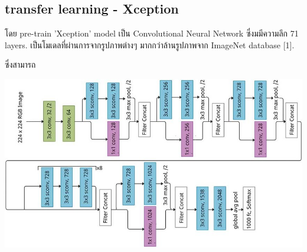   \subsection{transfer learning - Xception}
  โดย pre-train 'Xception' model เป็น Convolutional Neural Network ซึ่งมมีความลึก 71 layers.
เป็นโมเดลที่ผ่านการจากรูปภาพต่างๆ มากกว่าล้านรูปภาพจาก ImageNet database [1].


  ซึ่งสามารถ
\begin{center}
  \includegraphics[scale=0.35]{pic/x.png}
\end{center}




